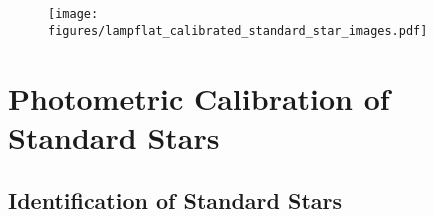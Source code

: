 \documentclass[twocolumn]{aastex631}
\begin{document}
\begin{figure}[ht!]
    \begin{centering}
        \texttt{[image: figures/lampflat\_calibrated\_standard\_star\_images.pdf]}
        \caption{}
        \label{fig:master_dark}
    \end{centering}
\end{figure}

\section{Photometric Calibration of Standard Stars}

\subsection{Identification of Standard Stars}



\end{document}
